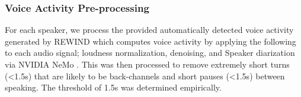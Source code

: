 \documentclass[manuscript,screen,review]{acmart}
\begin{document}
\subsubsection{Voice Activity Pre-processing}
\label{sec:vad}
For each speaker, we process the provided automatically detected voice activity generated by REWIND which computes voice activity by applying the following to each audio signal; loudness normalization, denoising, and Speaker diarization via NVIDIA NeMo \cite{kuchaiev2019nemo}. This was then processed to remove extremely short turns (<1.5s) that are likely to be back-channels and short pauses (<1.5s) between speaking. The threshold of 1.5s was determined empirically. 





\end{document}
